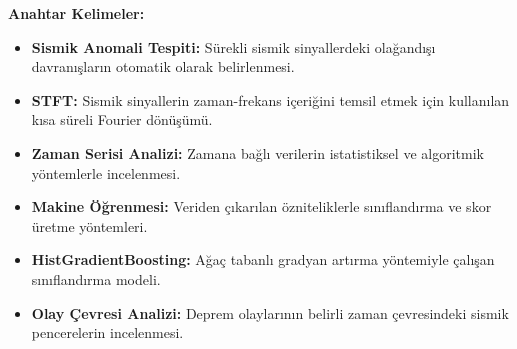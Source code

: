 \documentclass[12pt,a4paper,oneside]{book}
\begin{document}
\vspace{0.8cm}
\textbf{Anahtar Kelimeler:}

\begin{itemize}[leftmargin=*, itemsep=2pt]
    \item \textbf{Sismik Anomali Tespiti:} Sürekli sismik sinyallerdeki olağandışı davranışların otomatik olarak belirlenmesi.
    \item \textbf{STFT:} Sismik sinyallerin zaman-frekans içeriğini temsil etmek için kullanılan kısa süreli Fourier dönüşümü.
    \item \textbf{Zaman Serisi Analizi:} Zamana bağlı verilerin istatistiksel ve algoritmik yöntemlerle incelenmesi.
    \item \textbf{Makine Öğrenmesi:} Veriden çıkarılan özniteliklerle sınıflandırma ve skor üretme yöntemleri.
    \item \textbf{HistGradientBoosting:} Ağaç tabanlı gradyan artırma yöntemiyle çalışan sınıflandırma modeli.
    \item \textbf{Olay Çevresi Analizi:} Deprem olaylarının belirli zaman çevresindeki sismik pencerelerin incelenmesi.
\end{itemize}

\tableofcontents





\newpage
{}
\setcounter{page}{1}








\end{document}
